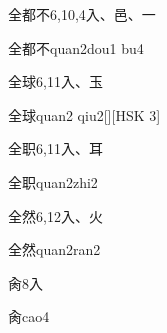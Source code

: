\begin{entry}{全都不}{6,10,4}{⼊、⾢、⼀}
  \begin{phonetics}{全都不}{quan2dou1 bu4}
  \end{phonetics}
\end{entry}

\begin{entry}{全球}{6,11}{⼊、⽟}
  \begin{phonetics}{全球}{quan2 qiu2}[][HSK 3]
  \end{phonetics}
\end{entry}

\begin{entry}{全职}{6,11}{⼊、⽿}
  \begin{phonetics}{全职}{quan2zhi2}
  \end{phonetics}
\end{entry}

\begin{entry}{全然}{6,12}{⼊、⽕}
  \begin{phonetics}{全然}{quan2ran2}
  \end{phonetics}
\end{entry}

\begin{entry}{肏}{8}{⼊}
  \begin{phonetics}{肏}{cao4}
  \end{phonetics}
\end{entry}


